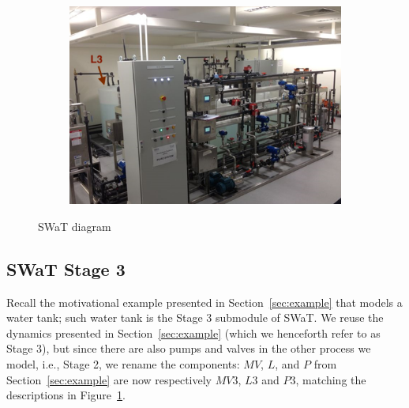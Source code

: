 {\begin{figure}[htb]
\begin{subfigure}[b]{.35\linewidth}
  \end{subfigure}
  \begin{subfigure}[b]{.35\linewidth}
  \includegraphics[width=\linewidth]{Figures/testbed2.png}
  \end{subfigure}
  
    \caption{SWaT diagram}
  \label{fig:SWaTSchema}
\end{figure}

\subsection{SWaT Stage 3}
Recall the motivational example presented in Section~\ref{sec:example} that models a water tank; such water tank is the Stage 3 submodule of SWaT. We reuse the dynamics presented in Section~\ref{sec:example} (which we henceforth refer to as Stage 3), but since there are also pumps and valves in the other process we model, i.e., Stage 2, we rename the components: $MV$, $L$, and $P$ from Section~\ref{sec:example} are now respectively $MV3$, $L3$ and $P3$, matching the descriptions in Figure~\ref{fig:SWaTSchema}.

}
